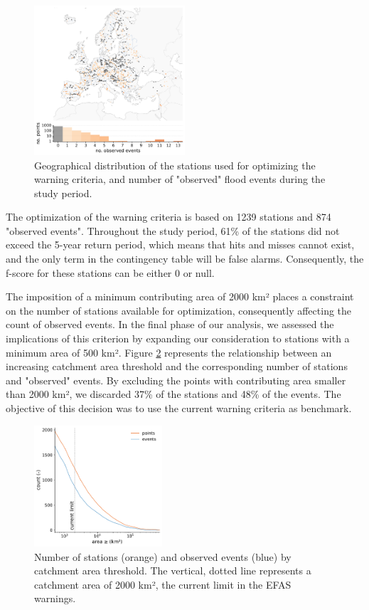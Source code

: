 \documentclass{ametsocV6.1}
\begin{document}
\begin{figure}[hb]
    \centering
    \includegraphics[width=0.5\textwidth]{figureA1.pdf}
    \caption{Geographical distribution of the stations used for optimizing the warning criteria, and number of "observed" flood events during the study period.}
    \label{fig:map_observed}
\end{figure}

The optimization of the warning criteria is based on 1239 stations and 874 "observed events". Throughout the study period, 61\% of the stations did not exceed the 5-year return period, which means that hits and misses cannot exist, and the only term in the contingency table will be false alarms. Consequently, the f-score for these stations can be either 0 or null.

The imposition of a minimum contributing area of 2000 km² places a constraint on the number of stations available for optimization, consequently affecting the count of observed events. In the final phase of our analysis, we assessed the implications of this criterion by expanding our consideration to stations with a minimum area of 500 km². Figure \ref{fig:observed_vs_area} represents the relationship between an increasing catchment area threshold and the corresponding number of stations and "observed" events. By excluding the points with contributing area smaller than 2000 km², we discarded 37\% of the stations and 48\% of the events. The objective of this decision was to use the current warning criteria as benchmark.

\begin{figure}[ht]
    \centering
    \includegraphics[width=0.425\textwidth]{figureA2.pdf}
    \caption{Number of stations (orange) and observed events (blue) by catchment area threshold. The vertical, dotted line represents a catchment area of 2000 km², the current limit in the EFAS warnings.}
    \label{fig:observed_vs_area}
\end{figure}
\end{document}
